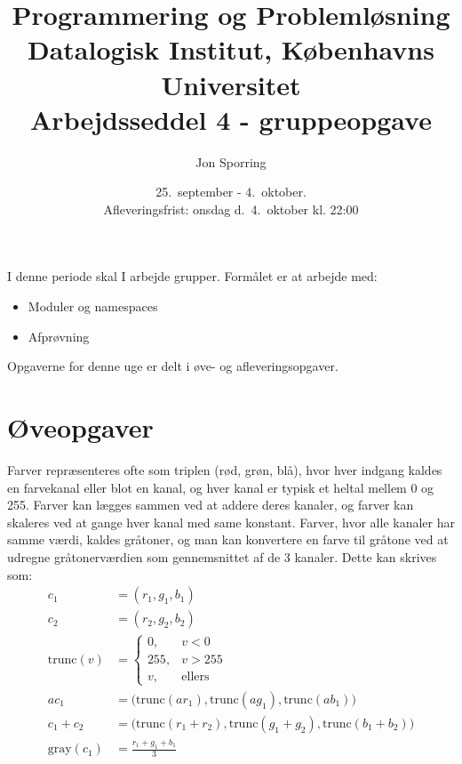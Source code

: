 \documentclass[a4paper,12pt]{article}
\title{Programmering og Problemløsning\\Datalogisk Institut,
  Københavns Universitet\\Arbejdsseddel 4 - gruppeopgave}
\author{Jon Sporring}
\date{25.\ september - 4.\ oktober.\\Afleveringsfrist: onsdag d.\ 4.\ oktober kl. 22:00}
\begin{document}
\maketitle

I denne periode skal I arbejde grupper. Formålet er at arbejde med:
\begin{itemize}
\item Moduler og namespaces
\item Afprøvning
\end{itemize}
 
Opgaverne for denne uge er delt i øve- og afleveringsopgaver. 

\section*{Øveopgaver}
Farver repræsenteres ofte som triplen (rød, grøn, blå), hvor hver indgang kaldes en farvekanal eller blot en kanal, og hver kanal er typisk et heltal mellem 0 og 255. Farver kan lægges sammen ved at addere deres kanaler, og farver kan skaleres ved at gange hver kanal med same konstant. Farver, hvor alle kanaler har samme værdi, kaldes gråtoner, og man kan konvertere en farve til gråtone ved at udregne gråtonerværdien som gennemsnittet af de 3 kanaler. Dette kan skrives som:
\begin{align}
  c_1 &= (r_1, g_1,b_1)
  \\c_2 &= (r_2, g_2,b_2)
  \\\text{trunc}(v) &=
  \begin{cases}
    0, &v < 0
    \\255, &v > 255
    \\v, &\text{ellers}
  \end{cases}
  \\a c_1 &= \big(\text{trunc}(a r_1), \text{trunc}(a g_1), \text{trunc}(a b_1)\big)
  \\c_1 + c_2 &= \big(\text{trunc}(r_1+r_2), \text{trunc}(g_1+g_2), \text{trunc}(b_1+b_2)\big)
  \\\text{gray}(c_1) &= \frac{r_1+g_1+b_1}{3}
\end{align}
\end{document}
